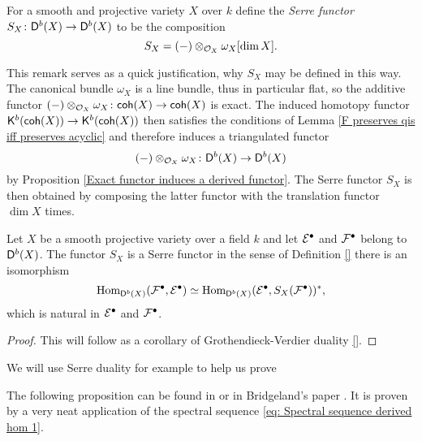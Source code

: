 \begin{definition}
    \label{Serre functor on Db(X)}
    For a smooth and projective variety $X$ over $k$ define the \emph{Serre functor} $S_X \colon \mathsf{D}^b(X) \to \mathsf{D}^b(X)$ to be the composition
    \[
        S_X = (-) \otimes_{\mathcal{O}_{X}} \omega_X[\dim X].
    \]
\end{definition}

\begin{remark}
    This remark serves as a quick justification, why $S_X$ may be defined in this way. The canonical bundle $\omega_X$ is a line bundle, thus in particular flat, so the additive functor $(-) \otimes_{\mathcal{O}_{X}} \omega_X \colon \mathsf{coh}(X) \to \mathsf{coh}(X)$ is exact. The induced homotopy functor $\mathsf{K}^{b}(\mathsf{coh}(X)) \to \mathsf{K}^{b}(\mathsf{coh}(X))$ then satisfies the conditions of Lemma \ref{F preserves qis iff preserves acyclic} and therefore induces a triangulated functor
    \[
        (-) \otimes_{\mathcal{O}_{X}} \omega_X \colon \mathsf{D}^b(X) \to \mathsf{D}^b(X)
    \]
    by Proposition \ref{Exact functor induces a derived functor}.
    The Serre functor $S_X$ is then obtained by composing the latter functor with the translation functor $\dim X$ times. 
    
\end{remark}

\begin{theorem}
    \label{Serre duality for derived cats}
    Let $X$ be a smooth projective variety over a field $k$ and let $\mathcal E^\bullet$ and $\mathcal F^\bullet$ belong to $\mathsf{D}^b(X)$. The functor $S_X$ is a Serre functor in the sense of Definition \ref{} \ie there is an isomorphism
    \[
        \operatorname{Hom}_{\mathsf{D}^b(X)}(\mathcal F^\bullet, \mathcal E^\bullet) \simeq \operatorname{Hom}_{\mathsf{D}^b(X)}(\mathcal E^\bullet, S_X(\mathcal F^\bullet))^*,
    \]
    which is natural in $\mathcal E^\bullet$ and $\mathcal F^\bullet$.
\end{theorem}

\begin{proof}
    This will follow as a corollary of Grothendieck-Verdier duality \ref{}.
\end{proof}

We will use Serre duality for example to help us prove 

The following proposition can be found in \cite[\S 3, Proposition 3.17]{huybrechts2006fouriermukai} or in Bridgeland's paper \cite[Example 2.2]{bridgeland2019equivalencestriangulatedcategoriesfouriermukai}. It is proven by a very neat application of the spectral sequence \eqref{eq: Spectral sequence derived hom 1}.

